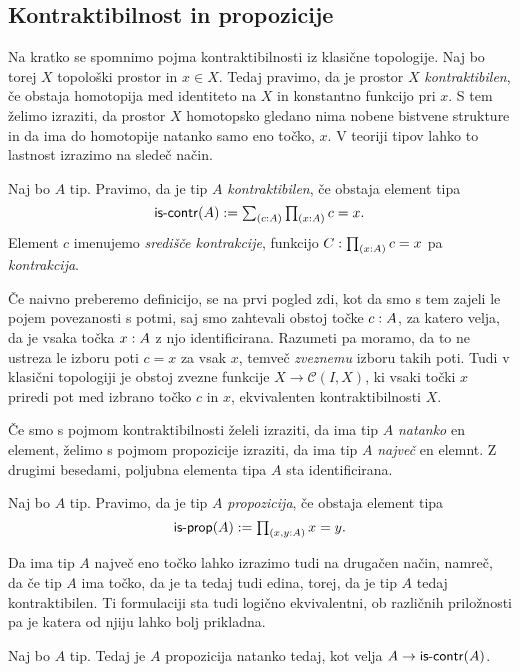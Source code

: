 \subsection{Kontraktibilnost in propozicije}
Na kratko se spomnimo pojma kontraktibilnosti iz klasične topologije. Naj bo torej \(X\) topološki prostor in \(x \in X\). Tedaj pravimo, da je prostor \(X\) \emph{kontraktibilen}, če obstaja homotopija med identiteto na \(X\) in konstantno funkcijo pri \(x\). S tem želimo izraziti, da prostor \(X\) homotopsko gledano nima nobene bistvene strukture in da ima do homotopije natanko samo eno točko, \(x\). V teoriji tipov lahko to lastnost izrazimo na sledeč način.
\begin{definicija}
  Naj bo \(A\) tip. Pravimo, da je tip \(A\) \emph{kontraktibilen}, če obstaja element tipa
  \[\textnormal{\textsf{is-contr}}(A) := \textstyle \sum_{\left( c : A \right)} \textstyle \prod_{\left( x : A \right)} c = x.\]
  Element \(c\) imenujemo \emph{središče kontrakcije}, funkcijo
  \(C : \textstyle \prod_{\left( x : A \right)} c = x\) pa \emph{kontrakcija}.
\end{definicija}
Če naivno preberemo definicijo, se na prvi pogled zdi, kot da smo s tem zajeli le pojem povezanosti s potmi, saj smo zahtevali obstoj točke \(c : A\), za katero velja, da je vsaka točka \(x : A\) z njo identificirana. Razumeti pa moramo, da to ne ustreza le izboru poti \(c = x\) za vsak \(x\), temveč \emph{zveznemu} izboru takih poti. Tudi v klasični topologiji je obstoj zvezne funkcije \(X \to \mathcal{C}(I, X)\), ki vsaki točki \(x\) priredi pot med izbrano točko \(c\) in \(x\), ekvivalenten kontraktibilnosti \(X\).

Če smo s pojmom kontraktibilnosti želeli izraziti, da ima tip \(A\) \emph{natanko} en element, želimo s pojmom propozicije izraziti, da ima tip \(A\) \emph{največ} en elemnt. Z drugimi besedami, poljubna elementa tipa \(A\) sta identificirana.

\begin{definicija}
  Naj bo \(A\) tip. Pravimo, da je tip \(A\) \emph{propozicija}, če obstaja element tipa
  \[\textnormal{\textsf{is-prop}}(A) := \textstyle \prod_{\left( x, y : A \right)} x = y.\]
\end{definicija}

Da ima tip \(A\) največ eno točko lahko izrazimo tudi na drugačen način, namreč, da če tip \(A\) ima točko, da je ta tedaj tudi edina, torej, da je tip \(A\) tedaj kontraktibilen. Ti formulaciji sta tudi logično ekvivalentni, ob različnih priložnosti pa je katera od njiju lahko bolj prikladna.

\begin{trditev}
  Naj bo \(A\) tip. Tedaj je \(A\) propozicija natanko tedaj, kot velja \(A \to \textnormal{\textsf{is-contr}}(A)\).
\end{trditev}

